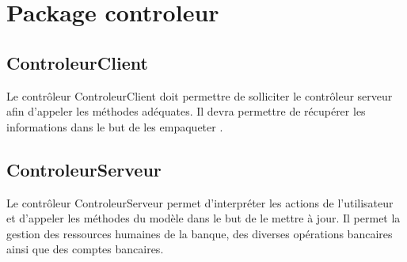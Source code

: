 {\color{green}{Les vues seront repartie selon différentes classes, à savoir AdminR, AjoutPersonnelR, StatistiquesR,
consulterCompteR, AccueilR et EchangerR}}

\section{Package controleur}


\subsection{ControleurClient}
Le contrôleur ControleurClient doit permettre de solliciter le contrôleur serveur afin d'appeler les méthodes adéquates.
Il devra permettre de récupérer les informations dans le but de les empaqueter {\color{red}{en RMI}}
 {\color{green}{en JSON afin de récuperer ces informations en REST}}.

\subsection{ControleurServeur}
Le contrôleur ControleurServeur permet d'interpréter les actions de l'utilisateur et d'appeler les méthodes du modèle
dans le but de le mettre à jour. Il permet la gestion des ressources humaines de la banque, des diverses opérations
bancaires ainsi que des comptes bancaires.
